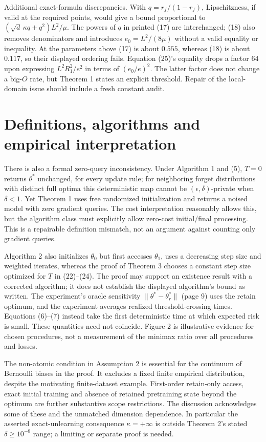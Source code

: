 \documentclass[10pt]{article}
\begin{document}
Additional exact-formula discrepancies. With \(q=r_f/(1-r_f)\), Lipschitzness, if valid at the required points, would give a bound proportional to \((\sqrt d\,\kappa q+q^2)L^2/\mu\). The powers of \(q\) in printed (17) are interchanged; (18) also removes denominators and introduces \(e_0=L^2/(8\mu)\) without a valid equality or inequality. At the parameters above (17) is about \(0.555\), whereas (18) is about \(0.117\), so their displayed ordering fails. Equation (25)’s equality drops a factor 64 upon expressing \(L^2R_1^2/e^2\) in terms of \((e_0/e)^2\). The latter factor does not change a big-\(O\) rate, but Theorem 1 states an explicit threshold. Repair of the local-domain issue should include a fresh constant audit.\par
\section*{Definitions, algorithms and empirical interpretation}
There is also a formal zero-query inconsistency. Under Algorithm 1 and (5), \(T=0\) returns \(\theta^*\) unchanged, for every update rule; for neighboring forget distributions with distinct full optima this deterministic map cannot be \((\epsilon,\delta)\)-private when \(\delta<1\). Yet Theorem 1 uses free randomized initialization and returns a noised model with zero gradient queries. The cost interpretation reasonably allows this, but the algorithm class must explicitly allow zero-cost initial/final processing. This is a repairable definition mismatch, not an argument against counting only gradient queries.\par
Algorithm 2 also initializes \(\theta_0\) but first accesses \(\theta_1\), uses a decreasing step size and weighted iterates, whereas the proof of Theorem 3 chooses a constant step size optimized for \(T\) in (22)–(24). The proof may support an existence result with a corrected algorithm; it does not establish the displayed algorithm’s bound as written. The experiment’s oracle sensitivity \(\|\theta^*-\theta_r^*\|\) (page 9) uses the retain optimum, and the experiment averages realized threshold-crossing times. Equations (6)–(7) instead take the first deterministic time at which expected risk is small. These quantities need not coincide. Figure 2 is illustrative evidence for chosen procedures, not a measurement of the minimax ratio over all procedures and losses.\par
The non-atomic condition in Assumption 2 is essential for the continuum of Bernoulli biases in the proof. It excludes a fixed finite empirical distribution, despite the motivating finite-dataset example. First-order retain-only access, exact initial training and absence of retained pretraining state beyond the optimum are further substantive scope restrictions. The discussion acknowledges some of these and the unmatched dimension dependence. In particular the asserted exact-unlearning consequence \(\kappa=+\infty\) is outside Theorem 2’s stated \(\delta\geq10^{-8}\) range; a limiting or separate proof is needed.\par
\end{document}

